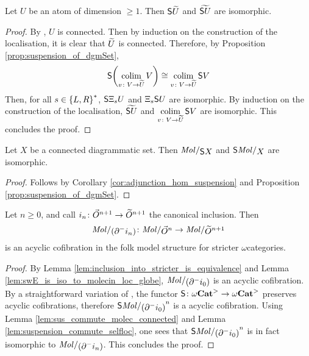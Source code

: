 \begin{lem} \label{lem:suspension_commute_selfloc} 
    Let \( U \) be an atom of dimension \( \geq 1 \).
    Then \( \mathsf{S}{\widetilde{U}} \) and \( \widetilde{\mathsf{S}{U}} \) are isomorphic. 
\end{lem}
\begin{proof}
    By \cite[Lemma 3.3.13]{hadzihasanovic2024combinatorics}, \( U \) is connected.
    Then by induction on the construction of the localisation, it is clear that \( \widetilde{U} \) is connected.
    Therefore, by Proposition \ref{prop:suspension_of_dgmSet}, 
    \begin{equation*}
        \mathsf{S}{\left(\operatorname*{colim}_{v \colon V \to \widetilde{U}} V\right)} \cong \operatorname*{colim}_{v \colon V \to \widetilde{U}} \mathsf{S}{V}
    \end{equation*}
    Then, for all \( s \in \left\{ {L, R} \right\}^* \), \( \mathsf{S}{\Xi_{s}U} \) and \( \Xi_{s} \mathsf{S}{U} \) are isomorphic.
    By induction on the construction of the localisation, \( \widetilde{\mathsf{S}{U}} \) and \( \operatorname*{colim}\limits_{v \colon V \to \widetilde{U}} \mathsf{S}{V} \) are isomorphic.    
    This concludes the proof.
\end{proof}

\begin{lem} \label{lem:sus_commute_molec_connected}
    Let \( X \) be a connected diagrammatic set.
    Then \( \molecin{\sus{X}} \) and \( \sus{\molecin{X}} \) are isomorphic.
\end{lem}
\begin{proof}
    Follows by Corollary \ref{cor:adjunction_hom_suspension} and Proposition \ref{prop:suspension_of_dgmSet}. 
\end{proof}

\begin{prop} \label{prop:walking_eq_of_dim_n}
    Let \( n \geq 0 \), and call \( i_n \colon \vec{O}^{n + 1} \to \widetilde{O}^{n + 1} \) the canonical inclusion.
    Then 
    \begin{equation*}
        \molecin{(\bd{}{-} i_n)} \colon \molecin{\dglobe{n}} \to \molecin{\rglobe{n + 1}} 
    \end{equation*}
    is an acyclic cofibration in the folk model structure for stricter \( \omega \)\nbd categories.
\end{prop}
\begin{proof}
    By Lemma \ref{lem:inclusion_into_stricter_is_equivalence} and Lemma \ref{lem:swE_is_iso_to_molecin_loc_globe}, \( \molecin{(\bd{}{-} i_0)} \) is an acyclic cofibration.
    By a straightforward variation of \cite[Proposition 2.8]{hadzihasanovic2024model}, the functor \( \mathsf{S}{} \colon {\omega\mathbf{Cat}}^> \to {\omega\mathbf{Cat}}^> \) preserves acyclic cofibrations, therefore \( \sus{\molecin{(\bd{}{-} i_0)}}^n \) is a acyclic cofibration.
    Using Lemma \ref{lem:sus_commute_molec_connected} and Lemma \ref{lem:suspension_commute_selfloc}, one sees that \( \sus{\molecin{(\bd{}{-} i_0)}}^n \) is in fact isomorphic to \( \molecin{(\bd{}{-} i_n)} \).
    This concludes the proof.
\end{proof}

